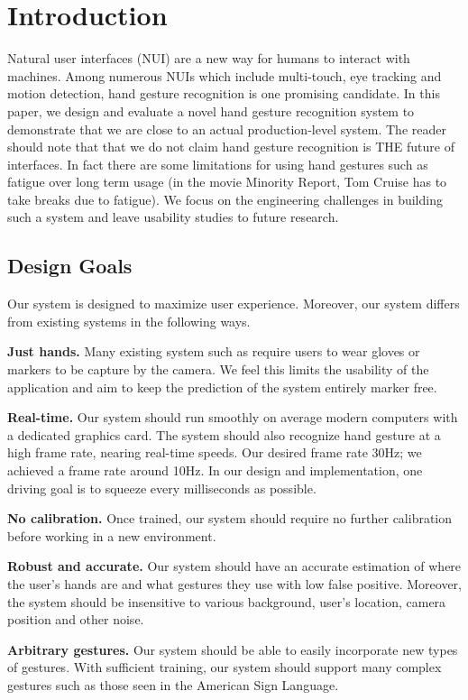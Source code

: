 \section{Introduction}
Natural user interfaces (NUI) are a new way for humans to interact with machines. Among numerous NUIs which include multi-touch, eye tracking and motion detection, hand gesture recognition is one promising candidate. In this paper, we design and evaluate a novel hand gesture recognition system to demonstrate that we are close to an actual production-level system. The reader should note that that we do not claim hand gesture recognition is THE future of interfaces. In fact there are some limitations for using hand gestures such as fatigue over long term usage (in the movie Minority Report, Tom Cruise has to take breaks due to fatigue). We focus on the engineering challenges in building such a system and leave usability studies to future research.

\subsection{Design Goals}
Our system is designed to maximize user experience. Moreover, our system differs from existing systems in the following ways.

\textbf{Just hands.} Many existing system such as \cite{mistry, minority, wang2009} require users to wear gloves or markers to be capture by the camera. We feel this limits the usability of the application and aim to keep the prediction of the system entirely marker free.
  
\textbf{Real-time.} Our system should run smoothly on average modern computers with a dedicated graphics card. The system should also recognize hand gesture at a high frame rate, nearing real-time speeds. Our desired frame rate 30Hz; we achieved a frame rate around 10Hz. In our design and implementation, one driving goal is to squeeze every milliseconds as possible. 

\textbf{No calibration.}  Once trained, our system should require no further calibration before working in a new environment. 

\textbf{Robust and accurate.} Our system should have an accurate estimation of where the user's hands are and what gestures they use with low false positive. Moreover, the system should be insensitive to various background, user's location, camera position and other noise. 

\textbf{Arbitrary gestures.} Our system should be able to easily incorporate new types of gestures. With sufficient training, our system should support many complex gestures such as those seen in the American Sign Language.


